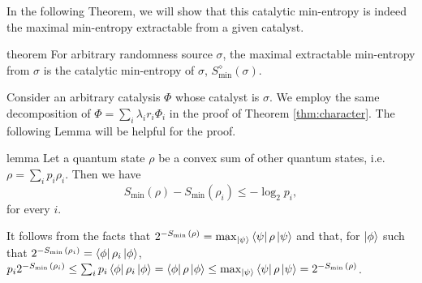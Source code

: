 \documentclass[aps, reprint, amsmath,amssymb, prx, superscriptaddress]{revtex4-2}
\begin{document}
In the following Theorem, we will show that this catalytic min-entropy is indeed the maximal min-entropy extractable from a given catalyst.





\begin{theoremEnd}{theorem} \label{thm:tradeoff2}
    For arbitrary randomness source $\sigma$, the maximal extractable min-entropy from $\sigma$ is the catalytic min-entropy of $\sigma$, $S_{\min{}}^\diamond(\sigma)$.
\end{theoremEnd}

\begin{proofEnd}
    Consider an arbitrary catalysis $\Phi$ whose catalyst is $\sigma$. We employ the same decomposition of $\Phi=\sum_i \lambda_i r_i \Phi_i$ in the proof of Theorem \ref{thm:character}. The following Lemma will be helpful for the proof.
    \begin{theoremEnd}{lemma} \label{lem:minineq}
    Let a quantum state $\rho$ be a convex sum of other quantum states, i.e. $\rho=\sum_i p_i \rho_i.$ Then we have
    $$S_{\min{}}(\rho) -S_{\min{}}(\rho_i) \leq - \log_2  p_i,$$
    for every $i.$
    \end{theoremEnd}
    It follows from the facts that $2^{-S_{\min{}}(\rho)}=\max_{\ket{\psi}} \bra{\psi}\rho\ket{\psi}$ and that, for $\ket{\phi}$ such that $2^{-S_{\min{}}(\rho_i)}=\bra{\phi}\rho_i\ket{\phi}$, $p_i 2^{-S_{\min{}}(\rho_i)}\leq \sum_i p_i \bra{\phi}\rho_i\ket{\phi} = \bra{\phi} \rho \ket{\phi} \leq \max_{\ket{\psi}}\bra{\psi}\rho\ket{\psi}=2^{-S_{\min{}}(\rho)}$.
    

\end{proofEnd}
\end{document}
